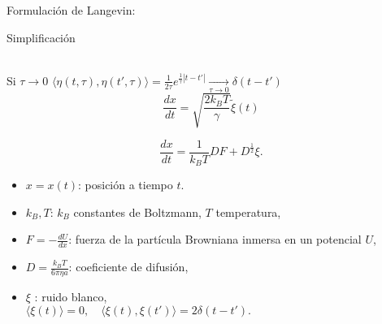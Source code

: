 \begin{frame}{ Formulación de Langevin:}
\begin{exampleblock}{Simplificaci\'on}
\begin{overlayarea}{\textwidth}{.4\textheight}
{           \\
            Si $\tau\to 0$
              $\langle
                  \eta(t,\tau),\eta(t',\tau)
                  \rangle=
                \frac{1}{2\tau}e^{\frac{1}{\tau}|t-t'|} \xrightarrow[\tau \to0]{}\delta(t-t')
              $
              $$
                  \frac{dx}{dt}=\sqrt{\frac{2k_BT}{\gamma}}\tilde{\xi}(t)
              $$
            }
     \end{overlayarea}
   \end{exampleblock}
\end{frame}
\begin{bibunit}[aalpha] 
\begin{frame} 
   \begin{alertblock}{\cite{gardiner1985handbook}}
      \begin{equation*}
          \frac{dx}{dt}=\frac{1}{k_BT} D F+D^{\frac{1}{2}}\xi.
        \end{equation*}
    \end{alertblock}
  \begin{itemize}
      \item $x=x(t)$: posici\'on a tiempo $t$.
      \item $k_B,T$: $k_B$  constantes de  Boltzmann, $T$ temperatura,
      \item $F= -\frac{dU}{dx}$:  fuerza de la part\'icula Browniana inmersa en un potencial $U$,
      \item $D=\frac{k_BT}{6\pi\eta a}$: coeficiente de difusi\'on,
      \item $\xi$ : ruido blanco,\\
        $%
          \langle\xi(t) \rangle=0, \quad
          \langle \xi(t),\xi(t')\rangle=2\delta(t-t').
        $%
   \end{itemize}
\end{frame}
\end{bibunit}
%
